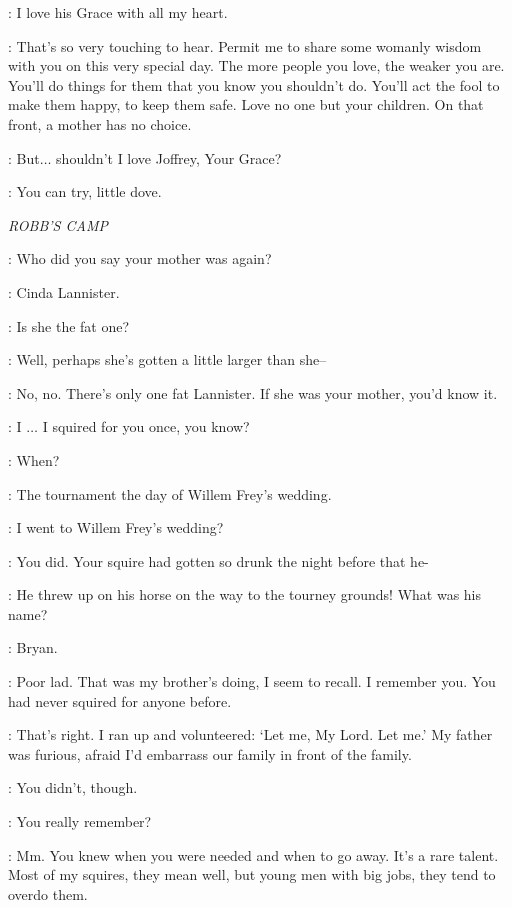 \SANSA: I love his Grace with all my heart.

\CERSEI: That's so very touching to hear. Permit me to share some womanly wisdom with you on this very special day. The more people you love, the weaker you are. You'll do things for them that you know you shouldn't do. You'll act the fool to make them happy, to keep them safe. Love no one but your children. On that front, a mother has no choice.

\SANSA: But$\ldots$ shouldn't I love Joffrey, Your Grace?

\CERSEI: You can try, little dove.


\scene

\textit{ROBB'S CAMP}


\JAIME: Who did you say your mother was again?

\ALTON: Cinda Lannister.

\JAIME: Is she the fat one?

\ALTON: Well, perhaps she's gotten a little larger than she--

\JAIME: No, no. There's only one fat Lannister. If she was your mother, you'd know it.

\ALTON: I $\ldots$ I squired for you once, you know?

\JAIME: When?

\ALTON: The tournament the day of Willem Frey's wedding.

\JAIME: I went to Willem Frey's wedding?

\ALTON: You did. Your squire had gotten so drunk the night before that he-

\JAIME: He threw up on his horse on the way to the tourney grounds! What was his name?

\ALTON: Bryan.

\JAIME: Poor lad. That was my brother's doing, I seem to recall. I remember you. You had never squired for anyone before.

\ALTON: That's right. I ran up and volunteered: `Let me, My Lord. Let me.' My father was furious, afraid I'd embarrass our family in front of the family.

\JAIME: You didn't, though.

\ALTON: You really remember?

\JAIME: Mm. You knew when you were needed and when to go away. It's a rare talent. Most of my squires, they mean well, but young men with big jobs, they tend to overdo them.

